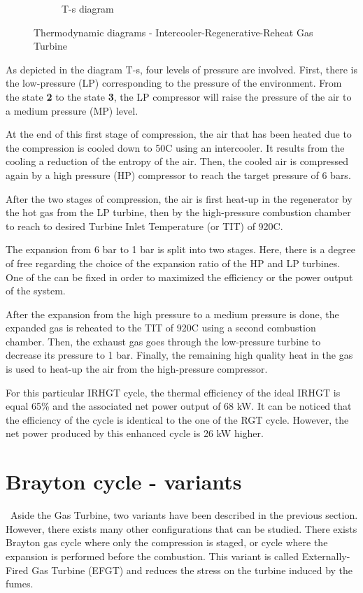 \begin{figure}[h]
\begin{subfigure}[b]{0.4\textwidth}
         \caption{T-s diagram}
         \label{fig:C5_Ts_IRHGT}
     \end{subfigure}
        \caption{Thermodynamic diagrams - Intercooler-Regenerative-Reheat Gas Turbine}
        \label{fig:C5_thermo_diagram_IRHGT}
\end{figure}

As depicted in the diagram T-s, four levels of pressure are involved. First, there is the low-pressure (LP) corresponding to the pressure of the environment. From the state \textbf{2} to the state \textbf{3}, the LP compressor will raise the pressure of the air to a medium pressure (MP) level. 

At the end of this first stage of compression, the air that has been heated due to the compression is cooled down to 50\degree C using an intercooler. It results from the cooling a reduction of the entropy of the air. Then, the cooled air is compressed again by a high pressure (HP) compressor to reach the target pressure of 6 bars.

After the two stages of compression, the air is first heat-up in the regenerator by the hot gas from the LP turbine, then by the high-pressure combustion chamber to reach to desired Turbine Inlet Temperature (or TIT) of 920\degree C. 

The expansion from 6 bar to 1 bar is split into two stages. Here, there is a degree of free regarding the choice of the expansion ratio of the HP and LP turbines. One of the can be fixed in order to maximized the efficiency or the power output of the system. 

After the expansion from the high pressure to a medium pressure is done, the expanded gas is reheated to the TIT of 920\degree C using a second combustion chamber. Then, the exhaust gas goes through the low-pressure turbine to decrease its pressure to 1 bar. Finally, the remaining high quality heat in the gas is used to heat-up the air from the high-pressure compressor.

For this particular IRHGT cycle, the thermal efficiency of the ideal IRHGT is equal 65\% and the associated net power output of 68 kW. It can be noticed that the efficiency of the cycle is identical to the one of the RGT cycle. However, the net power produced by this enhanced cycle is 26 kW higher. 

\section{Brayton cycle - variants}
\quad\ Aside the Gas Turbine, two variants have been described in the previous section. However, there exists many other configurations that can be studied. There exists Brayton gas cycle where only the compression is staged, or cycle where the expansion is performed before the combustion. This variant is called Externally-Fired Gas Turbine (EFGT) and reduces the stress on the turbine induced by the fumes.

